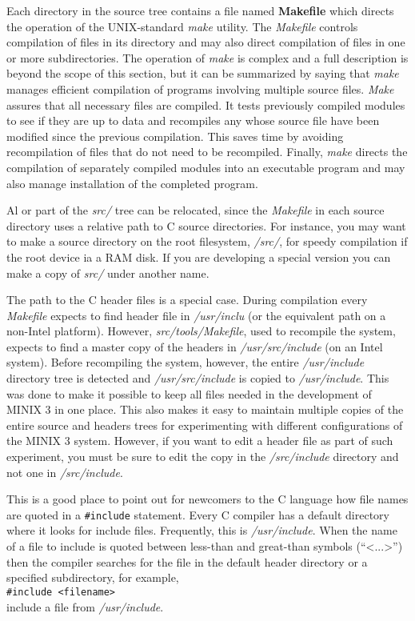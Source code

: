 \documentclass{book}
\newcommand {\kw}  [1] {\textbf{#1}}
\newcommand {\sys} [1] {\textsl{#1}}
\newcommand {\cmd} [1] {\texttt{#1}}
\begin{document}
Each directory in the source tree contains a file named \kw{Makefile} which directs the operation of the UNIX-standard \sys{make} utility.
The \sys{Makefile} controls compilation of files in its directory and may also direct compilation of files in one or more subdirectories.
The operation of \sys{make} is complex and a full description is beyond the scope of this section,
but it can be summarized by saying that \sys{make} manages efficient compilation of programs involving multiple source files.
\sys{Make} assures that all necessary files are compiled.
It tests previously compiled modules to see if they are up to data 
and recompiles any whose source file have been modified since the previous compilation.
This saves time by avoiding recompilation of files that do not need to be recompiled.
Finally, \sys{make} directs the compilation of separately compiled modules into an executable program 
and may also manage installation of the completed program.

Al  or part of the \sys{src/} tree can be relocated, since the \sys{Makefile} in each source directory uses a relative path to C source directories.
For instance, you may want to make a source directory on the root filesystem, \sys{/src/},
for speedy compilation if the root device ia a RAM disk.
If you are developing a special version you can make a copy of \sys{src/} under another name.

The path to the C header files is a special case.
During compilation every \sys{Makefile} expects to find header file in \sys{/usr/inclu} (or the equivalent path on a non-Intel platform).
However, \sys{src/tools/Makefile}, used to recompile the system, 
expects to find a master copy of the headers in \sys{/usr/src/include} (on an Intel system).
Before recompiling the system, however, the entire \sys{/usr/include} directory tree is detected 
and \sys{/usr/src/include} is copied to \sys{/usr/include}.
This was done to make it possible to keep all files needed in the development of MINIX 3 in one place.
This also makes it easy to maintain multiple copies of the entire source and headers trees 
for experimenting with different configurations of the MINIX 3 system.
However, if you want to edit a header file as part of such experiment, 
you must be sure to edit the copy in the \sys{/src/include} directory and not one in \sys{/src/include}.

This is a good place to point out for newcomers to the C language how file names are quoted in a \cmd{\#include} statement.
Every C compiler has a default directory where it looks for include files.
Frequently, this is \sys{/usr/include}.
When the name of a file to include is quoted between less-than and great-than symbols (``<...>'') then the compiler searches for the file in the default header directory or a specified subdirectory, for example,\\
\cmd{\#include <filename>}\\
include a file from \sys{/usr/include}.
\end{document}
